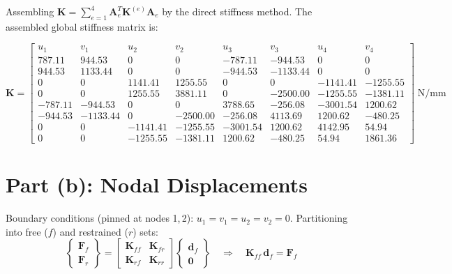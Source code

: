\documentclass[11pt, a4paper]{article}
\begin{document}
\noindent Assembling $\mathbf{K}=\sum_{e=1}^{4}\mathbf{A}_e^T\mathbf{K}^{(e)}\mathbf{A}_e$ by the direct stiffness method. The assembled global stiffness matrix is:

\begingroup\small
\setlength{\arraycolsep}{3pt}
\begin{equation}\label{eq:Kglobal}
\mathbf{K} =
\left[\begin{array}{rrrrrrrr}
u_1 & v_1 & u_2 & v_2 & u_3 & v_3 & u_4 & v_4 \\[2pt]
  787.11 &  944.53 &    0    &    0    & -787.11 & -944.53 &    0    &    0    \\
  944.53 & 1133.44 &    0    &    0    & -944.53 &-1133.44 &    0    &    0    \\
    0    &    0    & 1141.41 & 1255.55 &    0    &    0    &-1141.41 &-1255.55 \\
    0    &    0    & 1255.55 & 3881.11 &    0    &-2500.00 &-1255.55 &-1381.11 \\
 -787.11 & -944.53 &    0    &    0    & 3788.65 & -256.08 &-3001.54 & 1200.62 \\
 -944.53 &-1133.44 &    0    &-2500.00 & -256.08 & 4113.69 & 1200.62 & -480.25 \\
    0    &    0    &-1141.41 &-1255.55 &-3001.54 & 1200.62 & 4142.95 &   54.94 \\
    0    &    0    &-1255.55 &-1381.11 & 1200.62 & -480.25 &   54.94 & 1861.36
\end{array}\right]\;\text{N/mm}
\end{equation}
\endgroup

\section{Part (b): Nodal Displacements}\label{sec:partb}

Boundary conditions (pinned at nodes 1,\,2): $u_1=v_1=u_2=v_2=0$.  Partitioning into free ($f$) and restrained ($r$) sets:
\begin{equation}\label{eq:partition}
\begin{Bmatrix} \mathbf{F}_f \\ \mathbf{F}_r \end{Bmatrix}
=
\begin{bmatrix} \mathbf{K}_{ff} & \mathbf{K}_{fr} \\ \mathbf{K}_{rf} & \mathbf{K}_{rr} \end{bmatrix}
\begin{Bmatrix} \mathbf{d}_f \\ \mathbf{0} \end{Bmatrix}
\quad\Longrightarrow\quad
\mathbf{K}_{ff}\,\mathbf{d}_f = \mathbf{F}_f
\end{equation}
\end{document}
